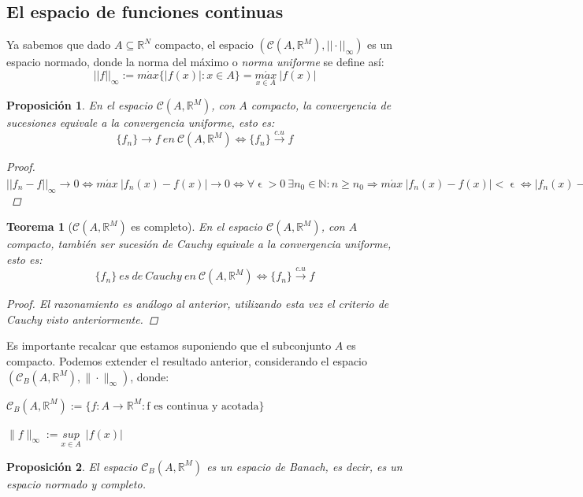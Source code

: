 \documentclass[11pt, a4paper]{article}
\let\epsilon\upvarepsilon
\newcommand{\R}{\mathbb{R}}
\newcommand{\fn}{\{f_n\}}
\theoremstyle{theorem-style}
\newtheorem{nth}{Teorema}[section]
\newtheorem*{nprop}{Proposición}
\theoremstyle{definition-style}
\theoremstyle{remark-style}
\theoremstyle{example-style}
\begin{document}
\subsection{El espacio de funciones continuas}

Ya sabemos que dado $A\subseteq \mathbb{R}^N$ compacto, el espacio $(\mathcal{C}(A,\mathbb{R}^M), ||\cdot||_{\infty})$ es un espacio normado, donde la norma del máximo o \textit{norma uniforme} se define así: $$||f||_{\infty} := m\acute{a}x \{ |f(x)|: x \in A\} = \underset{x\in A}{m\acute{a}x} \ |f(x)|$$

\begin{nprop} En el espacio $\mathcal{C}(A,\mathbb{R}^M)$, con $A$ compacto, la convergencia de sucesiones equivale a la convergencia uniforme, esto es: $$\fn \rightarrow f\ en\ \mathcal{C}(A,\mathbb{R}^M) \iff \fn \xrightarrow {c.u} f$$

\begin{proof} \hfill \\
$||f_n - f ||_{\infty} \rightarrow 0 \iff m\acute{a}x \ |f_n(x) - f(x)| \rightarrow 0 \iff \forall \epsilon > 0\ \exists n_0 \in \mathbb{N}: n \ge n_0 \Rightarrow m\acute{a}x \ |f_n(x) - f(x)| < \epsilon \iff |f_n(x) - f(x)| < \epsilon\  \forall x \in A \iff \fn \xrightarrow {c.u} f.$
\end{proof}
\end{nprop}

\begin{nth}[$\mathcal{C}(A,\R^M)$ es completo] En el espacio $\mathcal{C}(A,\mathbb{R}^M)$, con $A$ compacto, también ser sucesión de Cauchy equivale a la convergencia uniforme, esto es: $$\fn\ es\ de\ Cauchy\ en\ \mathcal{C}(A,\mathbb{R}^M) \iff \fn \xrightarrow {c.u} f $$

\begin{proof} El razonamiento es análogo al anterior, utilizando esta vez el criterio de Cauchy visto anteriormente.
\end{proof}
\end{nth}

Es importante recalcar que estamos suponiendo que el subconjunto $A$ es compacto. Podemos extender el resultado anterior, considerando el espacio $(\mathcal{C}_B(A,\mathbb{R}^M), \|\cdot\|_{\infty})$, donde: 

$\mathcal{C}_B(A,\mathbb{R}^M) := \{ f:A \longrightarrow \mathbb{R}^M: \text{f es continua y acotada}\}$

$\|f\|_{\infty} := \underset{x \in A}{sup} \ \ |f(x)|$

\begin{nprop} El espacio $\mathcal{C}_B(A, \mathbb{R}^M)$ es un espacio de Banach, es decir, es un espacio normado y completo.


\end{nprop}
\end{document}
